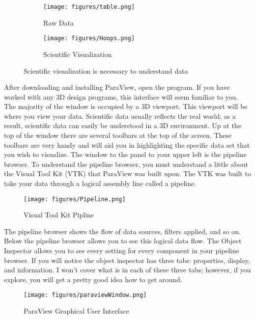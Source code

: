 \documentclass[letter,12pt,fleqn]{article}
\begin{document}
  \begin{figure}[h!]
  \begin{subfigure}{0.50\textwidth}
                \centering
                \texttt{[image: figures/table.png]}
                \caption{Raw Data}
                \label{fig:Visualization}
        \end{subfigure}
 \begin{subfigure}{0.50\textwidth}
                \centering
                \texttt{[image: figures/Hoops.png]}
                \caption{Scientific Visualization}
                \label{fig:Visualization}
        \end{subfigure}
    \caption{Scientific visualization is necessary to understand data}
\end{figure}
  
After downloading and installing ParaView, open the program. If you have worked with any 3D design programs, this interface will seem familiar to you. The majority of the window is occupied by a 3D viewport. This viewport will be where you view your data. Scientific data usually reflects the real world; as a result, scientific data can easily be understood in a 3D environment. Up at the top of the window there are several toolbars at the top of the screen. These toolbars are very handy and will aid you in highlighting the specific data set that you wish to visualize. The window to the panel to your upper left is the pipeline browser. To understand the pipeline browser, you must understand a little about the Visual Tool Kit (VTK) that ParaView was built upon. The VTK was built to take your data through a logical assembly line called a pipeline. 
 \begin{figure}[h!]
     \centering
     \texttt{[image: figures/Pipeline.png]}
    \caption{Visual Tool Kit Pipline}
\end{figure}
The pipeline browser shows the flow of data sources, filters applied, and so on. Below the pipeline browser allows you to see this logical data flow. The Object Inspector allows you to see every setting for every component in your pipeline browser. If you will notice the object inspector has three tabs: properties, display, and information. I won't cover what is in each of these three tabs; however, if you explore, you will get a pretty good idea how to get around.

 \begin{figure}[h!]
     \centering
     \texttt{[image: figures/paraviewWindow.png]}
    \caption{ParaView Graphical User Interface}
\end{figure}
\end{document}
